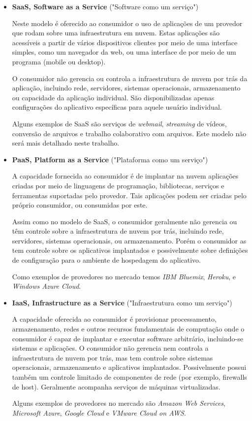 \begin{itemize}
  \item \textbf{SaaS, Software as a Service} ("Software como um serviço") 

  Neste modelo é oferecido ao consumidor o uso de aplicações de um provedor que rodam sobre uma infraestrutura em nuvem. Estas aplicações são acessíveis a partir de vários dispositivos clientes por meio de uma interface simples, como um navegador da web, ou uma interface de por meio de um programa (mobile ou desktop). 

  O consumidor não gerencia ou controla a infraestrutura de nuvem por trás da aplicação, incluindo rede, servidores, sistemas operacionais, armazenamento ou capacidade da aplicação individual. São disponibilizadas apenas configurações do aplicativo específicas para aquele usuário individual.

  Alguns exemplos de SaaS são serviços de \textit{webmail}, \textit{streaming} de vídeos, conversão de arquivos e trabalho colaborativo com arquivos. Este modelo não será mais detalhado neste trabalho.

  \item \textbf{PaaS, Platform as a Service} ("Plataforma como um serviço") 

  A capacidade fornecida ao consumidor é de implantar na nuvem aplicações criadas por meio de linguagens de programação, bibliotecas, serviços e ferramentas suportadas pelo provedor. Tais aplicações podem ser criadas pelo próprio consumidor, ou consumidas por este.

  Assim como no modelo de SaaS, o consumidor geralmente não gerencia ou têm controle sobre a infraestrutura de nuvem por trás, incluindo rede, servidores, sistemas operacionais, ou armazenamento. Porém o consumidor as tem controle sobre os aplicativos implantados e possivelmente sobre definições de configuração para o ambiente de hospedagem do aplicativo.

  Como exemplos de provedores no mercado temos \textit{IBM Bluemix}, \textit{Heroku}, e \textit{Windows Azure Cloud}.

  \item \textbf{IaaS, Infrastructure as a Service} ("Infraestrutura como um serviço") 

  A capacidade oferecida ao consumidor é provisionar processamento, armazenamento, redes e outros recursos fundamentais de computação onde o consumidor é capaz de implantar e executar software arbitrário, incluindo-se sistemas e aplicações. O consumidor não gerencia nem controla a infraestrutura de nuvem por trás, mas tem controle sobre sistemas operacionais, armazenamento e aplicativos implantados. Possivelmente possui também um controle limitado de componentes de rede (por exemplo, firewalls de host). Geralmente acompanha serviços de máquinas virtualizadas.

  Alguns exemplos de provedores no mercado são \textit{Amazon Web Services}, \textit{Microsoft Azure}, \textit{Google Cloud} e \textit{VMware Cloud on AWS}. 
\end{itemize}

